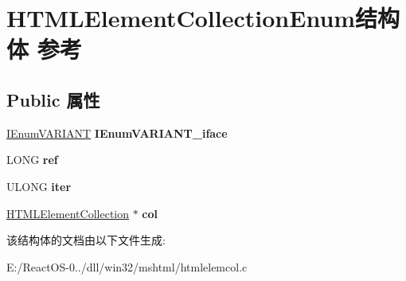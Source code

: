 \hypertarget{struct_h_t_m_l_element_collection_enum}{}\section{H\+T\+M\+L\+Element\+Collection\+Enum结构体 参考}
\label{struct_h_t_m_l_element_collection_enum}
\subsection*{Public 属性}
\begin{DoxyCompactItemize}
\item 
\mbox{\label{struct_h_t_m_l_element_collection_enum_a83a7bdf8747627ae12379f2957957c3c}} 
\hyperlink{interface_i_enum_v_a_r_i_a_n_t}{I\+Enum\+V\+A\+R\+I\+A\+NT} {\bfseries I\+Enum\+V\+A\+R\+I\+A\+N\+T\+\_\+iface}
\item 
\mbox{\label{struct_h_t_m_l_element_collection_enum_ae2dd1a422d722047ba0aa2d87cc4c235}} 
L\+O\+NG {\bfseries ref}
\item 
\mbox{\label{struct_h_t_m_l_element_collection_enum_ad4fe6198afe18e8b26a2d4d8a1d3ee6b}} 
U\+L\+O\+NG {\bfseries iter}
\item 
\mbox{\label{struct_h_t_m_l_element_collection_enum_a5ba1fac566f90d563388fc4dfd48a726}} 
\hyperlink{struct_h_t_m_l_element_collection}{H\+T\+M\+L\+Element\+Collection} $\ast$ {\bfseries col}
\end{DoxyCompactItemize}


该结构体的文档由以下文件生成\+:\begin{DoxyCompactItemize}
\item 
E\+:/\+React\+O\+S-\/0../dll/win32/mshtml/htmlelemcol.\+c\end{DoxyCompactItemize}

